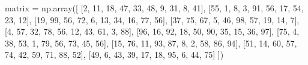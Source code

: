 \documentclass[
  letterpaper,
  DIV=11,
  numbers=noendperiod]{scrreprt}
\newenvironment{Shaded}{\begin{snugshade}}{\end{snugshade}}
\newcommand{\DecValTok}[1]{\textcolor[rgb]{0.68,0.00,0.00}{#1}}
\newcommand{\NormalTok}[1]{\textcolor[rgb]{0.00,0.23,0.31}{#1}}
\newcommand{\OperatorTok}[1]{\textcolor[rgb]{0.37,0.37,0.37}{#1}}
\begin{document}
\begin{tcolorbox}
\begin{tcolorbox}
\begin{Shaded}
\begin{Highlighting}[]
\NormalTok{matrix }\OperatorTok{=}\NormalTok{ np.array([}
\NormalTok{    [}\DecValTok{2}\NormalTok{, }\DecValTok{11}\NormalTok{, }\DecValTok{18}\NormalTok{, }\DecValTok{47}\NormalTok{, }\DecValTok{33}\NormalTok{, }\DecValTok{48}\NormalTok{, }\DecValTok{9}\NormalTok{, }\DecValTok{31}\NormalTok{, }\DecValTok{8}\NormalTok{, }\DecValTok{41}\NormalTok{],}
\NormalTok{    [}\DecValTok{55}\NormalTok{, }\DecValTok{1}\NormalTok{, }\DecValTok{8}\NormalTok{, }\DecValTok{3}\NormalTok{, }\DecValTok{91}\NormalTok{, }\DecValTok{56}\NormalTok{, }\DecValTok{17}\NormalTok{, }\DecValTok{54}\NormalTok{, }\DecValTok{23}\NormalTok{, }\DecValTok{12}\NormalTok{],}
\NormalTok{    [}\DecValTok{19}\NormalTok{, }\DecValTok{99}\NormalTok{, }\DecValTok{56}\NormalTok{, }\DecValTok{72}\NormalTok{, }\DecValTok{6}\NormalTok{, }\DecValTok{13}\NormalTok{, }\DecValTok{34}\NormalTok{, }\DecValTok{16}\NormalTok{, }\DecValTok{77}\NormalTok{, }\DecValTok{56}\NormalTok{],}
\NormalTok{    [}\DecValTok{37}\NormalTok{, }\DecValTok{75}\NormalTok{, }\DecValTok{67}\NormalTok{, }\DecValTok{5}\NormalTok{, }\DecValTok{46}\NormalTok{, }\DecValTok{98}\NormalTok{, }\DecValTok{57}\NormalTok{, }\DecValTok{19}\NormalTok{, }\DecValTok{14}\NormalTok{, }\DecValTok{7}\NormalTok{],}
\NormalTok{    [}\DecValTok{4}\NormalTok{, }\DecValTok{57}\NormalTok{, }\DecValTok{32}\NormalTok{, }\DecValTok{78}\NormalTok{, }\DecValTok{56}\NormalTok{, }\DecValTok{12}\NormalTok{, }\DecValTok{43}\NormalTok{, }\DecValTok{61}\NormalTok{, }\DecValTok{3}\NormalTok{, }\DecValTok{88}\NormalTok{],}
\NormalTok{    [}\DecValTok{96}\NormalTok{, }\DecValTok{16}\NormalTok{, }\DecValTok{92}\NormalTok{, }\DecValTok{18}\NormalTok{, }\DecValTok{50}\NormalTok{, }\DecValTok{90}\NormalTok{, }\DecValTok{35}\NormalTok{, }\DecValTok{15}\NormalTok{, }\DecValTok{36}\NormalTok{, }\DecValTok{97}\NormalTok{],}
\NormalTok{    [}\DecValTok{75}\NormalTok{, }\DecValTok{4}\NormalTok{, }\DecValTok{38}\NormalTok{, }\DecValTok{53}\NormalTok{, }\DecValTok{1}\NormalTok{, }\DecValTok{79}\NormalTok{, }\DecValTok{56}\NormalTok{, }\DecValTok{73}\NormalTok{, }\DecValTok{45}\NormalTok{, }\DecValTok{56}\NormalTok{],}
\NormalTok{    [}\DecValTok{15}\NormalTok{, }\DecValTok{76}\NormalTok{, }\DecValTok{11}\NormalTok{, }\DecValTok{93}\NormalTok{, }\DecValTok{87}\NormalTok{, }\DecValTok{8}\NormalTok{, }\DecValTok{2}\NormalTok{, }\DecValTok{58}\NormalTok{, }\DecValTok{86}\NormalTok{, }\DecValTok{94}\NormalTok{],}
\NormalTok{    [}\DecValTok{51}\NormalTok{, }\DecValTok{14}\NormalTok{, }\DecValTok{60}\NormalTok{, }\DecValTok{57}\NormalTok{, }\DecValTok{74}\NormalTok{, }\DecValTok{42}\NormalTok{, }\DecValTok{59}\NormalTok{, }\DecValTok{71}\NormalTok{, }\DecValTok{88}\NormalTok{, }\DecValTok{52}\NormalTok{],}
\NormalTok{    [}\DecValTok{49}\NormalTok{, }\DecValTok{6}\NormalTok{, }\DecValTok{43}\NormalTok{, }\DecValTok{39}\NormalTok{, }\DecValTok{17}\NormalTok{, }\DecValTok{18}\NormalTok{, }\DecValTok{95}\NormalTok{, }\DecValTok{6}\NormalTok{, }\DecValTok{44}\NormalTok{, }\DecValTok{75}\NormalTok{]}
\NormalTok{])}
\end{Highlighting}
\end{Shaded}


\end{tcolorbox}
\end{tcolorbox}
\end{document}

